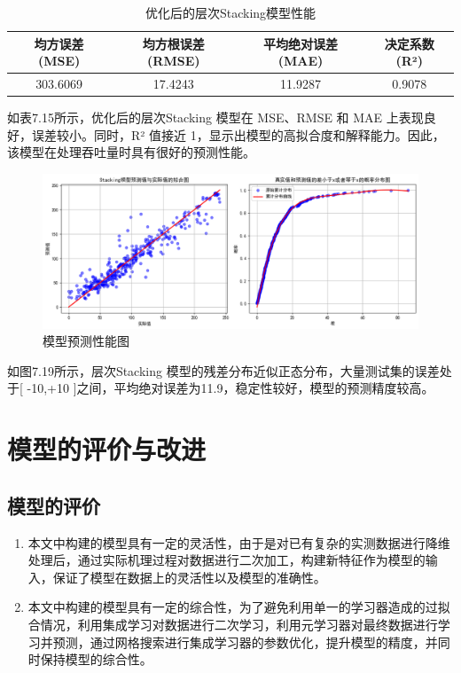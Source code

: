 \documentclass[bwprint]{gmcmthesis}
\begin{document}
\begin{table}[H]
	\centering
	\caption{优化后的层次Stacking模型性能}
	\begin{tabular}{@{}cccc@{}}
		\toprule
		 均方误差 (MSE) & 均方根误差 (RMSE) & 平均绝对误差 (MAE) & 决定系数 (R²) \\
		\midrule
		 303.6069 & 17.4243 & 11.9287 & 0.9078 \\
		\bottomrule
	\end{tabular}
\end{table}

如表7.15所示，优化后的层次Stacking 模型在 MSE、RMSE 和 MAE 上表现良好，误差较小。同时，R² 值接近 1，显示出模型的高拟合度和解释能力。因此，该模型在处理吞吐量时具有很好的预测性能。

\begin{figure}[H]
	\centering
	\includegraphics[width=0.8\linewidth]{figures/问题三888}
	\caption{模型预测性能图}
	\label{fig:888}
\end{figure}



如图7.19所示，层次Stacking 模型的残差分布近似正态分布，大量测试集的误差处于[ -10,+10 ]之间，平均绝对误差为11.9，稳定性较好，模型的预测精度较高。





\section{模型的评价与改进}
\subsection{模型的评价}

\begin{enumerate}
	\item 本文中构建的模型具有一定的灵活性，由于是对已有复杂的实测数据进行降维处理后，通过实际机理过程对数据进行二次加工，构建新特征作为模型的输入，保证了模型在数据上的灵活性以及模型的准确性。
	\item 本文中构建的模型具有一定的综合性，为了避免利用单一的学习器造成的过拟合情况，利用集成学习对数据进行二次学习，利用元学习器对最终数据进行学习并预测，通过网格搜索进行集成学习器的参数优化，提升模型的精度，并同时保持模型的综合性。
\end{enumerate}
\end{document}
